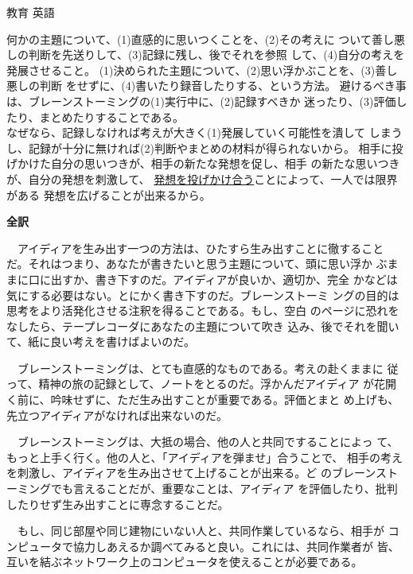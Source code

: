 \documentclass[fleqn]{jbook}
\begin{document}
\begin{answer}{教育 英語}{}
\begin{subanswers}
\baselineskip=15pt
\SubAnswer

  \begin{subsubanswers}
  \SubSubAnswer
    何かの主題について、(1)直感的に思いつくことを、(2)その考えに
    ついて善し悪しの判断を先送りして、(3)記録に残し、後でそれを参照
    して、(4)自分の考えを発展させること。
  \SubSubAnswer
    (1)決められた主題について、(2)思い浮かぶことを、(3)善し悪しの判断
    をせずに、(4)書いたり録音したりする、という方法。
  \SubSubAnswer
    避けるべき事は、ブレーンストーミングの(1)実行中に、(2)記録すべきか
    迷ったり、(3)評価したり、まとめたりすることである。\\
    なぜなら、記録しなければ考えが大きく(1)発展していく可能性を潰して
    しまうし、記録が十分に無ければ(2)判断やまとめの材料が得られないから。
  \SubSubAnswer
    相手に投げかけた自分の思いつきが、相手の新たな発想を促し、相手
    の新たな思いつきが、自分の発想を刺激して、
    \underline{発想を投げかけ合う}ことによって、一人では限界がある
    発想を広げることが出来るから。
  \end{subsubanswers}

  {\bf 全訳}

  　アイディアを生み出す一つの方法は、ひたすら生み出すことに徹すること
  だ。それはつまり、あなたが書きたいと思う主題について、頭に思い浮か
  ぶままに口に出すか、書き下すのだ。アイディアが良いか、適切か、完全
  かなどは気にする必要はない。とにかく書き下すのだ。ブレーンストーミ
  ングの目的は思考をより活発化させる注釈を得ることである。もし、空白
  のページに恐れをなしたら、テープレコーダにあなたの主題について吹き
  込み、後でそれを聞いて、紙に良い考えを書けばよいのだ。

  　ブレーンストーミングは、とても直感的なものである。考えの赴くままに
  従って、精神の旅の記録として、ノートをとるのだ。浮かんだアイディア
  が花開く前に、吟味せずに、ただ生み出すことが重要である。評価とまと
  め上げも、先立つアイディアがなければ出来ないのだ。

  　ブレーンストーミングは、大抵の場合、他の人と共同ですることによっ
  て、もっと上手く行く。他の人と、「アイディアを弾ませ」合うことで、
  相手の考えを刺激し、アイディアを生み出させて上げることが出来る。ど
  のブレーンストーミングでも言えることだが、重要なことは、アイディア
  を評価したり、批判したりせず生み出すことに専念することだ。

  　もし、同じ部屋や同じ建物にいない人と、共同作業しているなら、相手が
  コンピュータで協力しあえるか調べてみると良い。これには、共同作業者が
  皆、互いを結ぶネットワーク上のコンピュータを使えることが必要である。

\end{subanswers}
\end{answer}
\end{document}
